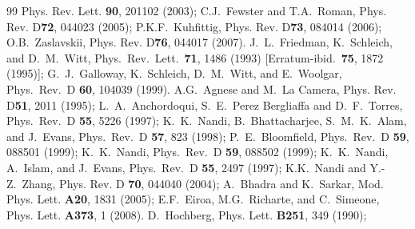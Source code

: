 \documentclass[aps,prd,twocolumn,eqsecnum,showpacs,amsmath]{revtex4}
\begin{document}
\begin{thebibliography}{99}
Phys. Rev. Lett. {\bf 90}, 201102 (2003);
C.J.~Fewster and T.A.~Roman,
Phys. Rev. D{\bf 72}, 044023 (2005); 
P.K.F.~Kuhfittig,
Phys. Rev. D{\bf 73}, 084014 (2006); 
O.B.~Zaslavskii, 
Phys. Rev. D{\bf 76}, 044017 (2007). 
  J.~L.~Friedman, K.~Schleich, and D.~M.~Witt,
  Phys.\ Rev.\ Lett.\  {\bf 71}, 1486 (1993)
  [Erratum-ibid.\  {\bf 75}, 1872 (1995)];
%
  G.~J.~Galloway, K.~Schleich, D.~M.~Witt, and E.~Woolgar,
  Phys.\ Rev.\  D {\bf 60}, 104039 (1999).
A.G.~Agnese and M.~La Camera,
Phys. Rev. D{\bf 51}, 2011 (1995);
  L.~A.~Anchordoqui, S.~E.~Perez Bergliaffa and D.~F.~Torres,
  Phys.\ Rev.\  D {\bf 55}, 5226 (1997);
  K.~K.~Nandi, B.~Bhattacharjee, S.~M.~K.~Alam, and J.~Evans,
  Phys.\ Rev.\  D {\bf 57}, 823 (1998);
  P.~E.~Bloomfield,
  Phys.\ Rev.\  D {\bf 59}, 088501 (1999);
  K.~K.~Nandi,
  Phys.\ Rev.\  D {\bf 59}, 088502 (1999);
  K.~K.~Nandi, A.~Islam, and J.~Evans,
  Phys.\ Rev.\  D {\bf 55}, 2497 (1997);
K.K.~Nandi and Y.-Z.~Zhang,
Phys. Rev. D {\bf 70}, 044040 (2004); 
A.~Bhadra and K.~Sarkar,
Mod. Phys. Lett. {\bf A20}, 1831 (2005);
E.F.~Eiroa, M.G.~Richarte, and C.~Simeone,
Phys. Lett. {\bf A373}, 1 (2008).
D.~Hochberg,
Phys. Lett. {\bf B251}, 349 (1990); 

\end{thebibliography}
\end{document}
